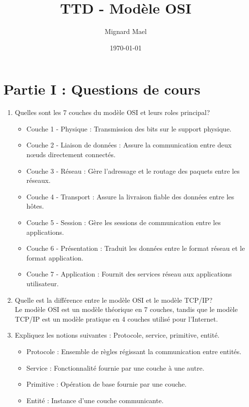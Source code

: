 \documentclass[a4paper,12pt]{article}
\title{TTD - Modèle OSI}
\author{Mignard Mael}
\date{\today}
\begin{document}
\maketitle

\section{Partie I : Questions de cours}
\begin{enumerate}
    \item Quelles sont les 7 couches du modèle OSI et leurs roles principal?\\
    \begin{itemize}
        \item Couche 1 - Physique : Transmission des bits sur le support physique.
        \item Couche 2 - Liaison de données : Assure la communication entre deux nœuds directement connectés.
        \item Couche 3 - Réseau : Gère l'adressage et le routage des paquets entre les réseaux.
        \item Couche 4 - Transport : Assure la livraison fiable des données entre les hôtes.
        \item Couche 5 - Session : Gère les sessions de communication entre les applications.
        \item Couche 6 - Présentation : Traduit les données entre le format réseau et le format application.
        \item Couche 7 - Application : Fournit des services réseau aux applications utilisateur.
    \end{itemize}
    \item Quelle est la différence entre le modèle OSI et le modèle TCP/IP?\\
    Le modèle OSI est un modèle théorique en 7 couches, tandis que le modèle TCP/IP est un modèle pratique en 4 couches utilisé pour l'Internet.
    \item Expliquez les notions suivantes : Protocole, service, primitive, entité.
    \begin{itemize}
        \item Protocole : Ensemble de règles régissant la communication entre entités.
        \item Service : Fonctionnalité fournie par une couche à une autre.
        \item Primitive : Opération de base fournie par une couche.
        \item Entité : Instance d'une couche communicante.

\end{itemize}
\end{enumerate}
\end{document}
